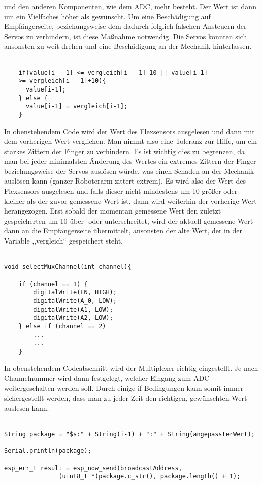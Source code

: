 \documentclass[titlepage,12pt,twoside]{article}
\begin{document}
und den anderen Komponenten, wie dem ADC, mehr besteht. Der Wert ist dann um ein 
Vielfaches höher als gewünscht. Um eine Beschädigung auf Empfängerseite, beziehungsweise 
dem dadurch folglich falschen Ansteuern der Servos zu verhindern, ist diese Maßnahme 
notwendig. Die Servos könnten sich ansonsten zu weit drehen und eine Beschädigung an 
der Mechanik hinterlassen. \\
\\
\footnotesize
\begin{lstlisting}
    if(value[i - 1] <= vergleich[i - 1]-10 || value[i-1]
	>= vergleich[i - 1]+10){
      value[i-1];
    } else {
      value[i-1] = vergleich[i-1];
    }
\end{lstlisting}
\hfill \break
\normalsize
In obenstehendem Code wird der Wert des Flexsensors ausgelesen und dann mit dem 
vorherigen Wert verglichen. Man nimmt also eine Toleranz zur Hilfe, um ein starkes 
Zittern der Finger zu verhindern. Es ist wichtig dies zu begrenzen, da man bei jeder 
minimalsten Änderung des Wertes ein extremes Zittern der Finger beziehungsweise der 
Servos auslösen würde, was einen Schaden an der Mechanik auslösen kann (ganzer 
Roboterarm zittert extrem). Es wird also der Wert des Flexsensors ausgelesen und falls 
dieser nicht mindestens um 10 größer oder kleiner als der zuvor gemessene Wert ist, dann 
wird weiterhin der vorherige Wert herangezogen. Erst sobald der momentan gemessene Wert 
den zuletzt gespeicherten um 10 über- oder unterschreitet, wird der aktuell gemessene 
Wert dann an die Empfängerseite übermittelt, ansonsten der alte Wert, der in der 
Variable ,,vergleich“ gespeichert steht. \\
\\
\footnotesize
\begin{lstlisting}
void selectMuxChannel(int channel){

	if (channel == 1) {
		digitalWrite(EN, HIGH);
		digitalWrite(A_0, LOW);
		digitalWrite(A1, LOW);
		digitalWrite(A2, LOW);
	} else if (channel == 2) 
		...
		...
	}
\end{lstlisting}
\hfill \break
\normalsize
In obenstehendem Codeabschnitt wird der Multiplexer richtig eingestellt. Je nach 
Channelnummer wird dann festgelegt, welcher Eingang zum ADC weitergeschalten werden 
soll. Durch einige if-Bedingungen kann somit immer sichergestellt werden, dass man 
zu jeder Zeit den richtigen, gewünschten Wert auslesen kann. \\
\\
\footnotesize
\begin{lstlisting}
String package = "$s:" + String(i-1) + ":" + String(angepassterWert);

Serial.println(package);

esp_err_t result = esp_now_send(broadcastAddress, 
        	   (uint8_t *)package.c_str(), package.length() + 1);
\end{lstlisting}
\end{document}

